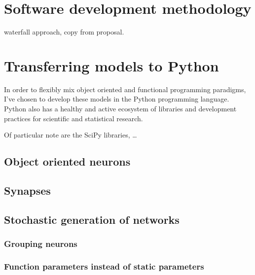 \section{Software development methodology}

waterfall approach, copy from proposal.

\section{Transferring models to Python}

In order to flexibly mix
object oriented and functional programming paradigms, I've chosen to develop these
models in the Python programming language. Python also has a healthy and active
ecosystem of libraries and development practices for scientific and statistical research.

Of particular note are the SciPy libraries, \ldots

\subsection{Object oriented neurons}

\subsection{Synapses}

\subsection{Stochastic generation of networks}

\subsubsection{Grouping neurons}

\subsubsection{Function parameters instead of static parameters}